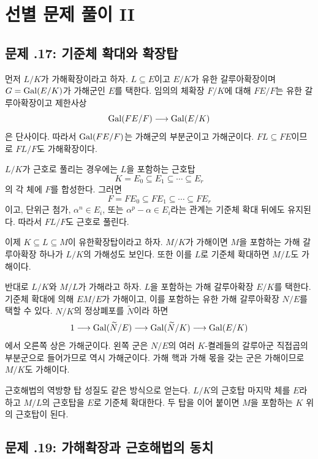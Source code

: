 \clearpage
\section{선별 문제 풀이 II}
\label{sec:radicals-solvable-solutions-b}

\subsection*{문제 \thechapter.17: 기준체 확대와 확장탑}

\begin{solution}
먼저 $L/K$가 가해확장이라고 하자. $L\subseteq E$이고 $E/K$가
유한 갈루아확장이며 $G=\operatorname{Gal}(E/K)$가 가해군인 $E$를 택한다.
임의의 체확장 $F/K$에 대해 $FE/F$는 유한 갈루아확장이고 제한사상
\[
  \operatorname{Gal}(FE/F)\longrightarrow\operatorname{Gal}(E/K)
\]
은 단사이다. 따라서 $\operatorname{Gal}(FE/F)$는 가해군의 부분군이고 가해군이다.
$FL\subseteq FE$이므로 $FL/F$도 가해확장이다.

$L/K$가 근호로 풀리는 경우에는 $L$을 포함하는 근호탑
\[
  K=E_0\subseteq E_1\subseteq\cdots\subseteq E_r
\]
의 각 체에 $F$를 합성한다. 그러면
\[
  F=FE_0\subseteq FE_1\subseteq\cdots\subseteq FE_r
\]
이고, 단위근 첨가, $\alpha^n\in E_i$, 또는
$\alpha^p-\alpha\in E_i$라는 관계는 기준체 확대 뒤에도 유지된다.
따라서 $FL/F$도 근호로 풀린다.

이제 $K\subseteq L\subseteq M$이 유한확장탑이라고 하자. $M/K$가
가해이면 $M$을 포함하는 가해 갈루아확장 하나가 $L/K$의 가해성도
보인다. 또한 이를 $L$로 기준체 확대하면 $M/L$도 가해이다.

반대로 $L/K$와 $M/L$가 가해라고 하자. $L$을 포함하는 가해
갈루아확장 $E/K$를 택한다. 기준체 확대에 의해 $EM/E$가 가해이고,
이를 포함하는 유한 가해 갈루아확장 $N/E$를 택할 수 있다. $N/K$의
정상폐포를 $\widetilde N$이라 하면
\[
  1\longrightarrow\operatorname{Gal}(\widetilde N/E)
  \longrightarrow\operatorname{Gal}(\widetilde N/K)
  \longrightarrow\operatorname{Gal}(E/K)
\]
에서 오른쪽 상은 가해군이다. 왼쪽 군은 $N/E$의 여러 $K$-켤레들의
갈루아군 직접곱의 부분군으로 들어가므로 역시 가해군이다. 가해 핵과
가해 몫을 갖는 군은 가해이므로 $M/K$도 가해이다.

근호해법의 역방향 탑 성질도 같은 방식으로 얻는다. $L/K$의 근호탑
마지막 체를 $E$라 하고 $M/L$의 근호탑을 $E$로 기준체 확대한다.
두 탑을 이어 붙이면 $M$을 포함하는 $K$ 위의 근호탑이 된다.
\end{solution}

\subsection*{문제 \thechapter.19: 가해확장과 근호해법의 동치}

